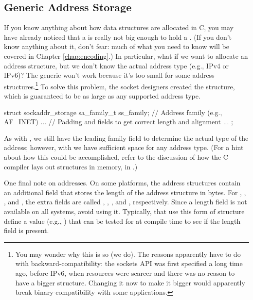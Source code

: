 \subsection{Generic Address Storage}

If you know anything about how data structures are allocated in C,
you may have already noticed that a  is really not big enough
to hold a .  (If you don't know anything about
it, don't fear: much of what you need to know will be covered in
Chapter \ref{chap:encoding}.)  In particular,
what if we want to allocate an address structure, but we don't know
the actual address type (e.g., IPv4 or IPv6)?  The 
generic  won't work because it's too small for some
address structures.\footnote{You may wonder why this is so (we do).  The
  reasons apparently have to do with backward-compatibility: the
  sockets API was first specified a long time ago, before IPv6, when
  resources were scarcer and
  there was no reason to have a bigger structure.  Changing it now to
  make it bigger   would apparently break binary-compatibility with
  some applications.} 
To solve this problem, the socket designers created the
 structure, which is 
guaranteed to be as large as any supported address type.

\begin{inlinecode}
struct sockaddr_storage {
    sa_family_t ss_family;     // Address family (e.g., AF_INET)
    ...
    // Padding and fields to get correct length and alignment
    ...
};
\end{inlinecode}

\noindent As with , we still have the leading family field to
determine the actual type of the address; however, with
 we have sufficient space for any address
type.
(For a hint about how this could be accomplished, refer to the
discussion of how the C compiler lays out structures in memory, in
.)

One final note on addresses.  On some platforms, the address structures
contain an additional field that stores the length of the address structure in
bytes.  For , , ,
and , the extra fields are called
, , , and
, respectively.  Since a length field is not available on all
systems, avoid using it.  Typically, that use this form of structure
define a value (e.g., ) that can be tested
for at compile time to see if the length field is present.

